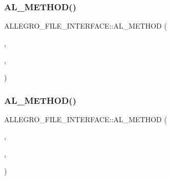\subsubsection{\texorpdfstring{A\+L\+\_\+\+M\+E\+T\+H\+O\+D()}{AL\_METHOD()}\hspace{0.1cm}{\footnotesize\ttfamily [4/13]}}
{\footnotesize\ttfamily A\+L\+L\+E\+G\+R\+O\+\_\+\+F\+I\+L\+E\+\_\+\+I\+N\+T\+E\+R\+F\+A\+C\+E\+::\+A\+L\+\_\+\+M\+E\+T\+H\+OD (\begin{DoxyParamCaption}\item[{size\+\_\+t}]{,  }\item[{fi\+\_\+fwrite}]{,  }\item[{(\hyperlink{file_8h_a9c6d4681b238d8c79191fd6fcc4bd6f8}{A\+L\+L\+E\+G\+R\+O\+\_\+\+F\+I\+LE} $\ast$f, \hyperlink{zconf_8h_a2c212835823e3c54a8ab6d95c652660e}{const} \hyperlink{png_8h_ac9c84fa68bbad002983e35ce3663c686}{void} $\ast$ptr, size\+\_\+t size)}]{ }\end{DoxyParamCaption})}

\mbox{\label{struct_a_l_l_e_g_r_o___f_i_l_e___i_n_t_e_r_f_a_c_e_a03a8721e51960d8219a89e9d731c7f28}} 
\subsubsection{\texorpdfstring{A\+L\+\_\+\+M\+E\+T\+H\+O\+D()}{AL\_METHOD()}\hspace{0.1cm}{\footnotesize\ttfamily [5/13]}}
{\footnotesize\ttfamily A\+L\+L\+E\+G\+R\+O\+\_\+\+F\+I\+L\+E\+\_\+\+I\+N\+T\+E\+R\+F\+A\+C\+E\+::\+A\+L\+\_\+\+M\+E\+T\+H\+OD (\begin{DoxyParamCaption}\item[{\hyperlink{astdbool_8h_abb452686968e48b67397da5f97445f5b}{bool}}]{,  }\item[{fi\+\_\+fflush}]{,  }\item[{(\hyperlink{file_8h_a9c6d4681b238d8c79191fd6fcc4bd6f8}{A\+L\+L\+E\+G\+R\+O\+\_\+\+F\+I\+LE} $\ast$f)}]{ }\end{DoxyParamCaption})}

